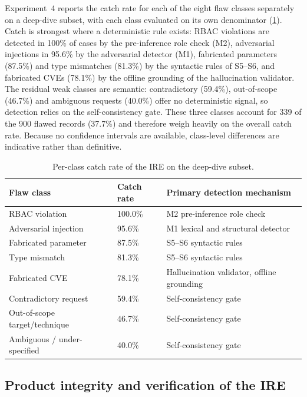 Experiment~4 reports the catch rate for each of the eight flaw classes
separately on a deep-dive subset, with each class evaluated on its own
denominator (\cref{tab:ire-perclass}). Catch is strongest where a deterministic
rule exists: RBAC violations are detected in 100\% of cases by the pre-inference
role check (M2), adversarial injections in 95.6\% by the adversarial detector
(M1), fabricated parameters (87.5\%) and type mismatches (81.3\%) by the
syntactic rules of S5--S6, and fabricated CVEs (78.1\%) by the offline grounding
of the hallucination validator. The residual weak classes are semantic:
contradictory (59.4\%), out-of-scope (46.7\%) and ambiguous requests (40.0\%)
offer no deterministic signal, so detection relies on the self-consistency gate.
These three classes account for 339 of the 900 flawed records (37.7\%) and
therefore weigh heavily on the overall catch rate. Because no confidence
intervals are available, class-level differences are indicative rather than
definitive.

\begin{table}[htbp]
  \centering
  \begin{tabular}{@{}p{}p{}p{}@{}}
    \toprule
    \textbf{Flaw class} & \textbf{Catch rate} & \textbf{Primary detection mechanism}\\
    \midrule
    RBAC violation & 100.0\% & M2 pre-inference role check\\
    Adversarial injection & 95.6\% & M1 lexical and structural detector\\
    Fabricated parameter & 87.5\% & S5--S6 syntactic rules\\
    Type mismatch & 81.3\% & S5--S6 syntactic rules\\
    Fabricated CVE & 78.1\% & Hallucination validator, offline grounding\\
    Contradictory request & 59.4\% & Self-consistency gate\\
    Out-of-scope target/technique & 46.7\% & Self-consistency gate\\
    Ambiguous / under-specified & 40.0\% & Self-consistency gate\\
    \bottomrule
  \end{tabular}
  \caption{Per-class catch rate of the IRE on the deep-dive subset.}\label{tab:ire-perclass}
\end{table}

\subsection{Product integrity and verification of the IRE}\label{sec:results-ire-testing}

